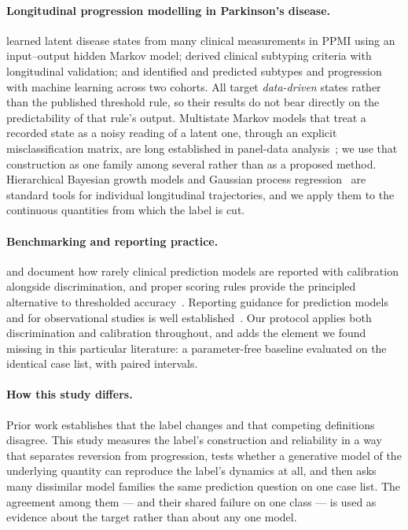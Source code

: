 \documentclass[11pt]{article}
\begin{document}
\paragraph{Longitudinal progression modelling in Parkinson's disease.}
\citet{severson2021} learned latent disease states from many clinical
measurements in PPMI using an input--output hidden Markov model;
\citet{fereshtehnejad2017} derived clinical subtyping criteria with longitudinal
validation; and \citet{dadu2022} identified and predicted subtypes and
progression with machine learning across two cohorts. All target
\emph{data-driven} states rather than the published threshold rule, so their
results do not bear directly on the predictability of that rule's output.
Multistate Markov models that treat a recorded state as a noisy reading of a
latent one, through an explicit misclassification matrix, are long established in
panel-data analysis~\citep{jackson2003,jackson2011}; we use that construction as
one family among several rather than as a proposed method. Hierarchical Bayesian
growth models and Gaussian process regression~\citep{rasmussen2006} are standard
tools for individual longitudinal trajectories, and we apply them to the
continuous quantities from which the label is cut.

\paragraph{Benchmarking and reporting practice.}
\citet{bouwmeester2012} and \citet{vancalster2019} document how rarely clinical
prediction models are reported with calibration alongside discrimination, and
proper scoring rules provide the principled alternative to thresholded
accuracy~\citep{gneiting2007}. Reporting guidance for prediction models and for
observational studies is well established~\citep{collins2024,vonelm2007}. Our
protocol applies both discrimination and calibration throughout, and adds the
element we found missing in this particular literature: a parameter-free
baseline evaluated on the identical case list, with paired intervals.

\paragraph{How this study differs.}
Prior work establishes that the label changes and that competing definitions
disagree. This study measures the label's construction and reliability in a way
that separates reversion from progression, tests whether a generative model of
the underlying quantity can reproduce the label's dynamics at all, and then asks
many dissimilar model families the same prediction question on one case list.
The agreement among them --- and their shared failure on one class --- is used as
evidence about the target rather than about any one model.
\end{document}
